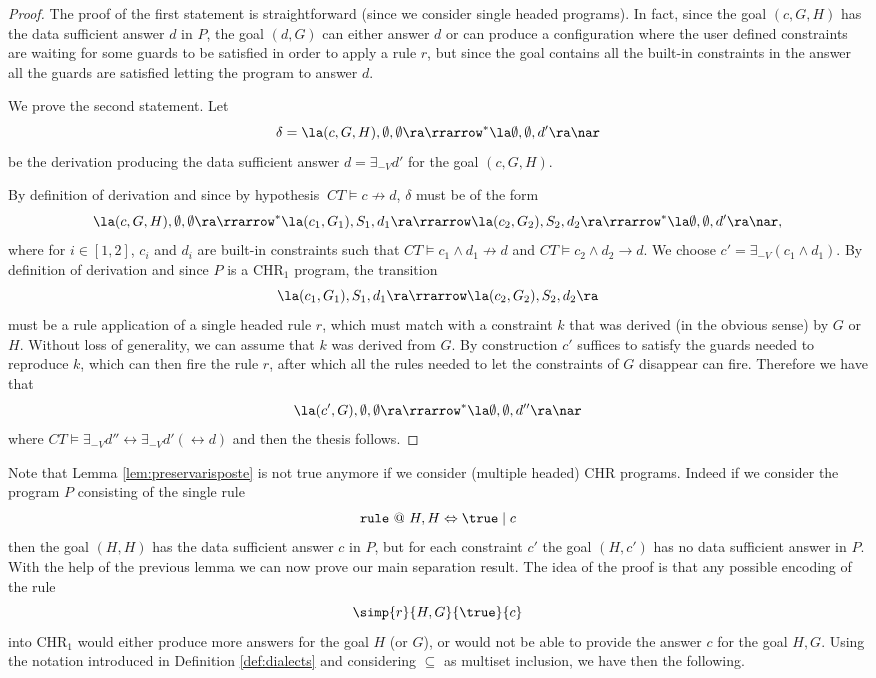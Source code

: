 \begin{proof}
The proof of the first statement is straightforward (since we consider single headed programs). In fact, since the goal $(c,G,H)$ has the data sufficient answer $d $ in $P$, the goal $(d,G)$ can either answer $d$ or can produce a configuration where the user defined constraints are waiting for some guards to be satisfied in order to apply a rule $r$, but since the goal contains all the built-in constraints in the answer all the guards are satisfied letting the program to answer $d$.

We prove the second statement.
Let  $$ \delta=\la (c, G, H), \emptyset,\emptyset \ra
\rrarrow ^{*}\la \emptyset, \emptyset, d' \ra \nar$$ be the derivation producing the data sufficient answer $d=\exists _{-V} d'$ for the goal $(c, G, H)$.

By definition of derivation and since by hypothesis $\ CT \models c \not \rightarrow d$,
$\delta$ must be of the form
 $$  \la (c, G, H), \emptyset,\emptyset \ra \rrarrow ^{*}\la (c_1, G_1) , S_1, d_1 \ra
      \rrarrow
            \la (c_2, G_2) , S_2, d_2 \ra
      \rrarrow ^{*}
      \la \emptyset, \emptyset, d' \ra \nar,
     $$
where for $i\in [1,2]$, $c_i$ and $d_i$  are built-in constraints such that
$CT \models c_1 \wedge d_1 \not \rightarrow d$ and
$CT \models c_2 \wedge d_2 \rightarrow d$.
We choose $c'= \exists _{-V} (c_1 \wedge d_1)$.
By definition of derivation and since $P$ is a CHR$_1$ program, the transition
$$\la (c_1, G_1) , S_1, d_1 \ra \rrarrow
\la (c_2, G_2) , S_2, d_2 \ra$$ must be a rule application of a single headed rule $r$, which must match with a constraint $k$ that was derived (in the obvious sense) by $G$ or $H$. Without loss of generality, we can assume that $k$ was derived from $G$.
By construction $c'$ suffices to satisfy the guards needed to reproduce $k$, which can then fire the rule $r$, after which all the rules needed to let the constraints of $G$ disappear can fire.
Therefore we have that $$\la (c', G) , \emptyset, \emptyset \ra \rrarrow ^{*}
 \la \emptyset, \emptyset, d'' \ra \nar$$ where $CT \models \exists _{-V} d''\leftrightarrow \exists _{-V} d' (\leftrightarrow d)$ and then the thesis follows.
\end{proof}









 Note that Lemma \ref{lem:preservarisposte} is not true anymore if we consider (multiple headed) CHR programs.
 Indeed if we consider the program $P$ consisting of the single rule $$\texttt{rule}\ @\ H, H \Leftrightarrow \true \mid c$$ then the goal $(H, H)$ has the data sufficient answer $c$ in $P$, but for each constraint $c'$ the goal  $(H, c')$ has no data sufficient answer in $P$.
With the help of the previous lemma we can now prove our main separation result.
The idea of the proof is that any possible encoding of the  rule $$ \simp{r}{H, G}{\true}{c}$$ into CHR$_1$ would either produce more answers for the goal $H$ (or $G$), or would not be able to provide the answer $c$ for
the goal $H,G$.
Using the notation introduced in Definition \ref{def:dialects} and considering $\subseteq$ as multiset inclusion, we have then the following.


